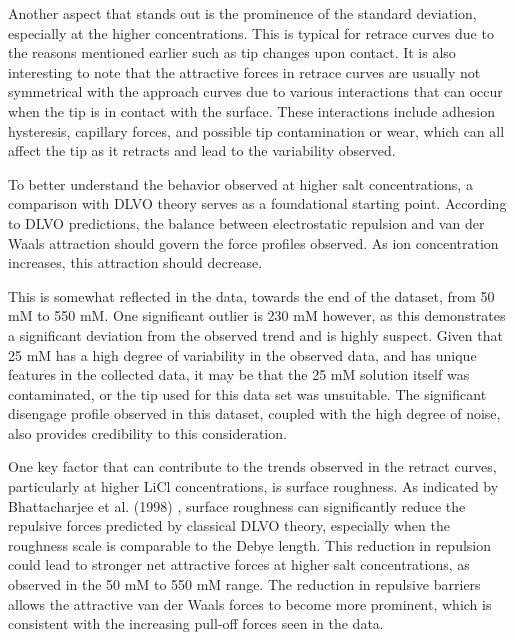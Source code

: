 Another aspect that stands out is the prominence of the standard deviation, especially at the higher concentrations. This is typical for retrace curves due to the reasons mentioned earlier such as tip changes upon contact. It is also interesting to note that the attractive forces in retrace curves are usually not symmetrical with the approach curves due to various interactions that can occur when the tip is in contact with the surface. These interactions include adhesion hysteresis, capillary forces, and possible tip contamination or wear, which can all affect the tip as it retracts and lead to the variability observed.

To better understand the behavior observed at higher salt concentrations, a comparison with DLVO theory serves as a foundational starting point. According to DLVO predictions, the balance between electrostatic repulsion and van der Waals attraction should govern the force profiles observed. As ion concentration increases, this attraction should decrease. 

This is somewhat reflected in the data, towards the end of the dataset, from 50 mM to 550 mM. One significant outlier is 230 mM however, as this demonstrates a significant deviation from the observed trend and is highly suspect. Given that 25 mM has a high degree of variability in the observed data, and has unique features in the collected data, it may be that the 25 mM solution itself was contaminated, or the tip used for this data set was unsuitable. The significant disengage profile observed in this dataset, coupled with the high degree of noise, also provides credibility to this consideration.

One key factor that can contribute to the trends observed in the retract curves, particularly at higher LiCl concentrations, is surface roughness. As indicated by Bhattacharjee et al. (1998) \cite{Bhattacharjee1998}, surface roughness can significantly reduce the repulsive forces predicted by classical DLVO theory, especially when the roughness scale is comparable to the Debye length. This reduction in repulsion could lead to stronger net attractive forces at higher salt concentrations, as observed in the 50 mM to 550 mM range. The reduction in repulsive barriers allows the attractive van der Waals forces to become more prominent, which is consistent with the increasing pull-off forces seen in the data.

